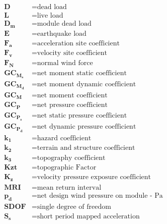 \vspace{-.4in}
\begingroup
\allowdisplaybreaks
\begin{align*}
    \bm{D}       & = \textrm{dead load}                               \\
    \bm{L}       & = \textrm{live load}                               \\                 
    \bm{D_m}     & = \textrm{module dead load}                        \\
    \bm{E}       & = \textrm{earthquake load}                         \\
    \bm{F_a}     & = \textrm{acceleration site coefficient}           \\
    \bm{F_v}     & = \textrm{velocity site coefficient}               \\
    \bm{F_N}     & = \textrm{normal wind force}                       \\
    \bm{GC_M_s}  & = \textrm{net moment static coefficient}           \\
    \bm{GC_M_d}  & = \textrm{net moment dynamic coefficient}          \\
    \bm{GC_M}    & = \textrm{net moment coefficient}                  \\
    \bm{GC_P}    & = \textrm{net pressure coefficient}                \\
    \bm{GC_P_s}  & = \textrm{net static pressure coefficient}         \\
    \bm{GC_P_d}  & = \textrm{net dynamic pressure coefficient}        \\
    \bm{k_1}     & = \textrm{hazard coefficient}                      \\
    \bm{k_2}     & = \textrm{terrain and structure coefficient}       \\
    \bm{k_3}     & = \textrm{topography coefficient}                  \\
    \bm{Kzt}     & = \textrm{topographic Factor}                      \\
    \bm{K_z}     & = \textrm{velocity pressure exposure coefficient}  \\
    \bm{MRI}     & = \textrm{mean return interval}                    \\
    \bm{p_d}     & = \textrm{net design wind pressure on module - Pa} \\
    \bm{SDOF}    & = \textrm{single degree of freedom}                \\
    \bm{S_s}     & = \textrm{short period mapped acceleration}        \\

\end{align*}
